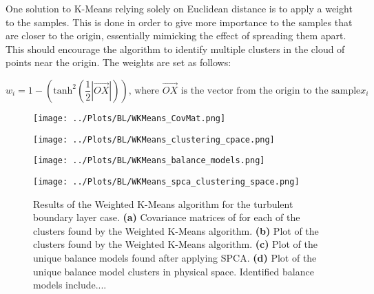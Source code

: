 \documentclass[12pt]{report} %
\begin{document}
One solution to K-Means relying solely on Euclidean distance is to apply a weight to the samples. This is done in order to give more importance to the samples that are closer to the origin, essentially mimicking the effect of spreading them apart. This should encourage the algorithm to identify multiple clusters in the cloud of points near the origin. The weights are set as follows:

\begin{equation}
  w_i = 1 - (\text{tanh}^{2}(\frac{1}{2}|\vec{OX}|)) \text{, where } \vec{OX} \text{ is the vector from the origin to the sample} x_i
\end{equation}

\begin{figure}[htbp]
  \centering

  \begin{minipage}{0.7\textwidth}
    \centering
    \texttt{[image: ../Plots/BL/WKMeans\_CovMat.png]}
    \subcaption{}
  \end{minipage}

  \begin{minipage}{\textwidth}
      \begin{minipage}[b]{0.6\textwidth}
          \centering
          \texttt{[image: ../Plots/BL/WKMeans\_clustering\_cpace.png]}
          \subcaption{}
      \end{minipage}
      \begin{minipage}[b]{0.35\textwidth}
          \centering
          \texttt{[image: ../Plots/BL/WKMeans\_balance\_models.png]}
          \subcaption{}
      \end{minipage}
  \end{minipage}

  \begin{minipage}{0.7\textwidth}
      \centering
      \texttt{[image: ../Plots/BL/WKMeans\_spca\_clustering\_space.png]}
      \subcaption{}
  \end{minipage}
  \caption{Results of the Weighted K-Means algorithm for the turbulent boundary layer case. \textbf{(a)} Covariance matrices of for each of the clusters found by the Weighted K-Means algorithm. \textbf{(b)} Plot of the clusters found by the Weighted K-Means algorithm. \textbf{(c)} Plot of the unique balance models found after applying SPCA. \textbf{(d)} Plot of the unique balance model clusters in physical space. Identified balance models include....}

  \label{fig:WKMeans_results}
\end{figure}
\end{document}
